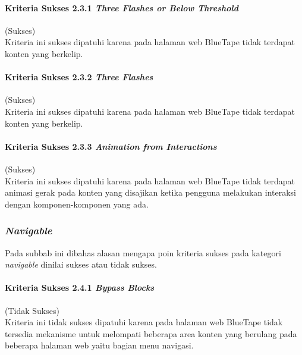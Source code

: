 \paragraph{Kriteria Sukses 2.3.1 \textit{Three Flashes or Below Threshold}}
\label{par:kepatuhan_bluetape_kriteria_sukses_2.3.1}
(Sukses)\\

Kriteria ini sukses dipatuhi karena pada halaman web BlueTape tidak terdapat konten yang berkelip.

\paragraph{Kriteria Sukses 2.3.2 \textit{Three Flashes}}
\label{par:kepatuhan_bluetape_kriteria_sukses_2.3.2}
(Sukses)\\

Kriteria ini sukses dipatuhi karena pada halaman web BlueTape tidak terdapat konten yang berkelip.

\paragraph{Kriteria Sukses 2.3.3 \textit{Animation from Interactions}}
\label{par:kepatuhan_bluetape_kriteria_sukses_2.3.3}
(Sukses)\\

Kriteria ini sukses dipatuhi karena pada halaman web BlueTape tidak terdapat animasi gerak pada konten yang disajikan ketika pengguna melakukan interaksi dengan komponen-komponen yang ada.

\subsubsection{\textit{Navigable}}
\label{subsubsec:kepatuhan_bluetape_navigable}
Pada subbab ini dibahas alasan mengapa poin kriteria sukses pada kategori \textit{navigable} dinilai sukses atau tidak sukses.

\paragraph{Kriteria Sukses 2.4.1 \textit{Bypass Blocks}}
\label{par:kepatuhan_bluetape_kriteria_sukses_2.4.1}
(Tidak Sukses)\\

Kriteria ini tidak sukses dipatuhi karena pada halaman web BlueTape tidak tersedia mekanisme untuk melompati beberapa area konten yang berulang pada beberapa halaman web yaitu bagian menu navigasi.

